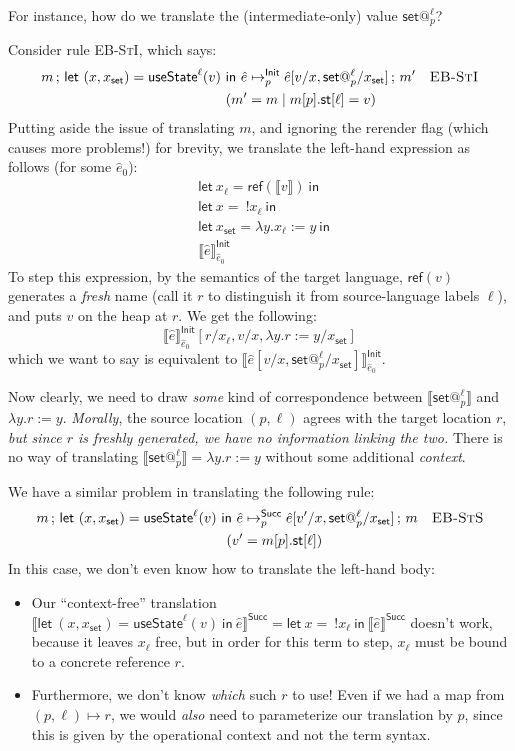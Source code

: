 \documentclass{article}
\makeatletter
\newcommand{\mf}[1]{\mathsf{#1}}
\newcommand{\ts}[1]{\textsc{#1}}
\newcommand{\semi}{\,;\,}
\newcommand{\llrr}[1]{\llbracket #1 \rrbracket}
\newcommand{\bstep}[6]{#1 \semi #2 \mapsto^{#3}_{#4} #5 \semi #6}
\newcommand{\vset}[2]{\mf{set}@^{#1}_{#2}}
\newcommand{\elet}[3]{\mf{let}\ #1 = #2\ \mf{in}\ #3}
\newcommand{\estate}[4]{\mf{let}\ (#1, #1_{\mf{set}}) = \mf{useState}^{#2}(#3)\ \mf{in}\ #4}
\newcommand{\eref}[1]{\mf{ref}(#1)}
\newcommand{\eget}[1]{\ !#1}
\newcommand{\eset}[2]{#1 := #2}
\makeatother
\begin{document}
For instance, how do we translate the (intermediate-only)
value $\vset{\ell}{p}$?

Consider rule \ts{EB-StI}, which says:
\begin{align*}
\bstep{m}{\estate{x}{\ell}{v}{\hat{e}}&}{\mf{Init}}{p}
{\hat{e}[v/x, \vset{\ell}{p}/x_\mf{set}]}{m'}
&&\ts{EB-StI}\\
(m' &= m \mid m[p].\mf{st}[\ell] = v)
\end{align*}
Putting aside the issue of translating $m$,
and ignoring the rerender flag (which causes more problems!)
for brevity, we translate
the left-hand expression as follows (for some $\hat{e}_0$):
\begin{align*}
&\elet{x_\ell}{\eref{\llrr{v}}}{\\
  &\elet{x}{\eget{x_\ell}}{\\
    &\elet{x_\mf{set}}{\lambda y.\eset{x_\ell}{y}}{\\
      &\llrr{\hat{e}}^\mf{Init}_{\hat{e}_0}
    }
  }
}
\end{align*}
To step this expression, by the semantics of the target language,
$\eref{v}$ generates a \emph{fresh} name
(call it $r$ to distinguish it from source-language labels $\ell$),
and puts $v$ on the heap at $r$.
We get the following:
$$\llrr{\hat{e}}^\mf{Init}_{\hat{e}_0}
[r/x_\ell, v/x, \lambda y.\eset{r}{y}/x_\mf{set}]$$
which we want to say is equivalent to 
$\llrr{\hat{e}[v/x,\vset{\ell}{p}/x_\mf{set}]}^\mf{Init}_{\hat{e}_0}$.

Now clearly, we need to draw \emph{some} kind of correspondence between
$\llrr{\vset{\ell}{p}}$ and $\lambda y.\eset{r}{y}$.
\emph{Morally}, the source location $(p, \ell)$
agrees with the target location $r$,
\emph{but since $r$ is freshly generated,
we have no information linking the two.}
There is no way of translating 
$\llrr{\vset{\ell}{p}}=\lambda y.\eset{r}{y}$
without some additional \emph{context}.

We have a similar problem in translating the following rule:
\begin{align*}
\bstep{m}{\estate{x}{\ell}{v}{\hat{e}}&}{\mf{Succ}}{p}
{\hat{e}[v'/x, \vset{\ell}{p}/x_\mf{set}]}{m}
&&\ts{EB-StS}\\
(v' &= m[p].\mf{st}[\ell])
\end{align*}
In this case, we don't even know how to translate the left-hand body:
\begin{itemize}
\item Our ``context-free'' translation 
$\llrr{\estate{x}{\ell}{v}{\hat{e}}}^\mf{Succ}
= \elet{x}{\eget{x_\ell}}{\llrr{\hat{e}}^\mf{Succ}}$
doesn't work, because it leaves $x_\ell$ free,
but in order for this term to step, $x_\ell$ must be bound to
a concrete reference $r$.
\item Furthermore, we don't know \emph{which} such $r$ to use!
Even if we had a map from $(p, \ell) \mapsto r$,
we would \emph{also} need to parameterize our translation
by $p$, since this is given by the operational context
and not the term syntax.
\end{itemize}
\end{document}
